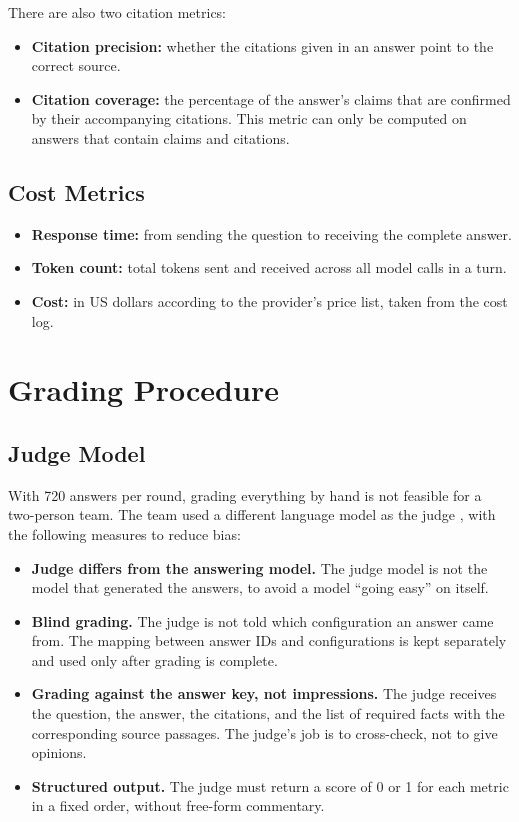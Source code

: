 There are also two citation metrics:

\begin{itemize}
    \item \textbf{Citation precision:} whether the citations given in an answer point to the correct source.
    \item \textbf{Citation coverage:} the percentage of the answer's claims that are confirmed by their accompanying citations. This metric can only be computed on answers that contain claims and citations.
\end{itemize}

\subsection{Cost Metrics}

\begin{itemize}
    \item \textbf{Response time:} from sending the question to receiving the complete answer.
    \item \textbf{Token count:} total tokens sent and received across all model calls in a turn.
    \item \textbf{Cost:} in US dollars according to the provider's price list, taken from the cost log.
\end{itemize}

\section{Grading Procedure}

\subsection{Judge Model}

With 720 answers per round, grading everything by hand is not feasible for a two-person team. The team used a different language model as the judge , with the following measures to reduce bias:

\begin{itemize}
    \item \textbf{Judge differs from the answering model.} The judge model is not the model that generated the answers, to avoid a model ``going easy'' on itself.
    \item \textbf{Blind grading.} The judge is not told which configuration an answer came from. The mapping between answer IDs and configurations is kept separately and used only after grading is complete.
    \item \textbf{Grading against the answer key, not impressions.} The judge receives the question, the answer, the citations, and the list of required facts with the corresponding source passages. The judge's job is to cross-check, not to give opinions.
    \item \textbf{Structured output.} The judge must return a score of 0 or 1 for each metric in a fixed order, without free-form commentary.
\end{itemize}

